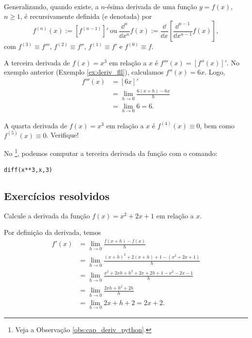 Generalizando, quando existe, a $n$-ésima derivada de uma função $y = f(x)$, $n\geq 1$, é recursivamente definida (e denotada) por
\begin{equation}
  f^{(n)}(x) := [f^{(n-1)}]' ~ \text{ou} ~ \frac{\dd^n}{\dd x^n}f(x) := \frac{\dd}{\dd x}\left[\frac{\dd^{n-1}}{\dd x^{n-1}}f(x)\right],
\end{equation}
com $f^{(3)}\equiv f'''$, $f^{(2)}\equiv f''$, $f^{(1)}\equiv f'$ e $f^{(0)}\equiv f$.

\begin{ex}
  A terceira derivada de $f(x) = x^3$ em relação a $x$ é $f'''(x) = [f''(x)]'$. No exemplo anterior (Exemplo \ref{ex:deriv_fll}), calculamos $f''(x) = 6x$. Logo,
    \begin{align}
      f'''(x) &= [6x]' \\
              &= \lim_{h\to 0} \frac{6(x+h)-6x}{h} \\
              &= \lim_{h\to 0} 6 = 6.
    \end{align}

    A quarta derivada de $f(x) = x^3$ em relação a $x$ é $f^{(4)}(x) \equiv 0$, bem como $f^{(5)}(x) \equiv 0$. Verifique!

    \ifispython
    No \sympy\footnote{Veja a Observação \ref{obs:cap_deriv_python}.}, podemos computar a terceira derivada da função com o comando:
\begin{verbatim}
diff(x**3,x,3)
\end{verbatim}
  \fi  
\end{ex}


\subsection*{Exercícios resolvidos}

\begin{exeresol}
  Calcule a derivada da função $f(x) = x^2 + 2x + 1$ em relação a $x$.
\end{exeresol}
\begin{resol}
  Por definição da derivada, temos
  \begin{align}
    f'(x) &= \lim_{h\to 0} \frac{f(x+h)-f(x)}{h}\\
          &= \lim_{h\to 0} \frac{(x+h)^2 + 2(x+h) + 1 - (x^2+2x+1)}{h}\\
          &= \lim_{h\to 0} \frac{x^2+2xh+h^2+2x+2h+1-x^2-2x-1}{h}\\
          &= \lim_{h\to 0} \frac{2xh+h^2+2h}{h}\\
          &= \lim_{h\to 0} 2x+h+2 = 2x+2.
  \end{align}
\end{resol}

